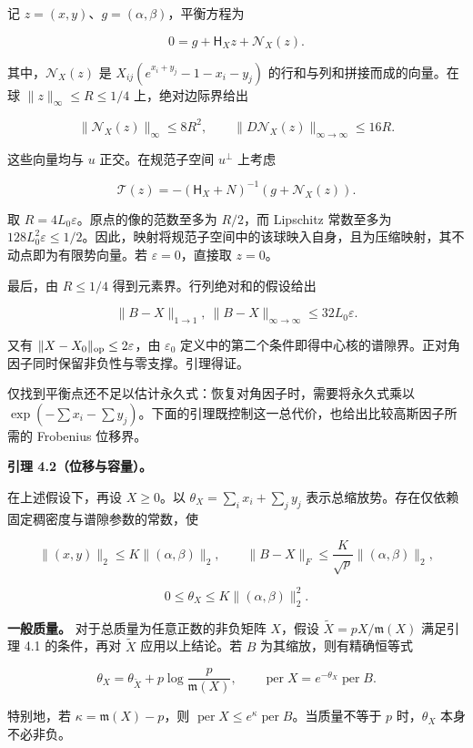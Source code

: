 \documentclass[11pt,a4paper]{article}
\begin{document}
记 \(z=(x,y)\)、\(g=(\alpha,\beta)\)，平衡方程为

\[0=g+\mathsf H_Xz+\mathcal N_X(z).\]

其中，\(\mathcal N_X(z)\) 是 \(X_{ij}(e^{x_i+y_j}-1-x_i-y_j)\) 的行和与列和拼接而成的向量。在球 \(\|z\|_\infty\le R\le1/4\) 上，绝对边际界给出

\[\|\mathcal N_X(z)\|_\infty\le8R^2,\qquad \|D\mathcal N_X(z)\|_{\infty\to\infty}\le16R.\]

这些向量均与 \(u\) 正交。在规范子空间 \(u^\perp\) 上考虑

\[\mathcal T(z)=-(\mathsf H_X+N)^{-1}(g+\mathcal N_X(z)).\]

取 \(R=4L_0\varepsilon\)。原点的像的范数至多为 \(R/2\)，而 Lipschitz 常数至多为 \(128L_0^2\varepsilon\le1/2\)。因此，映射将规范子空间中的该球映入自身，且为压缩映射，其不动点即为有限势向量。若 \(\varepsilon=0\)，直接取 \(z=0\)。

最后，由 \(R\le1/4\) 得到元素界。行列绝对和的假设给出

\[\|B-X\|_{1\to1},\ \|B-X\|_{\infty\to\infty}\le32L_0\varepsilon.\]

又有 \(\|X-X_0\|_{\rm op}\le2\varepsilon\)，由 \(\varepsilon_0\) 定义中的第二个条件即得中心核的谱隙界。正对角因子同时保留非负性与零支撑。引理得证。

仅找到平衡点还不足以估计永久式：恢复对角因子时，需要将永久式乘以 \(\exp(-\sum x_i-\sum y_j)\)。下面的引理既控制这一总代价，也给出比较高斯因子所需的 Frobenius 位移界。

\textbf{引理 4.2（位移与容量）。}

在上述假设下，再设 \(X\ge0\)。以 \(\theta_X=\sum_i x_i+\sum_j y_j\) 表示总缩放势。存在仅依赖固定稠密度与谱隙参数的常数，使

\[\|(x,y)\|_2\le K\|(\alpha,\beta)\|_2,\qquad \|B-X\|_F\le\frac K{\sqrt p}\|(\alpha,\beta)\|_2,\]

\[0\le\theta_X\le K\|(\alpha,\beta)\|_2^2.\]

\textbf{一般质量。} 对于总质量为任意正数的非负矩阵 \(X\)，假设 \(\widetilde X=pX/\mathfrak m(X)\) 满足引理 4.1 的条件，再对 \(\widetilde X\) 应用以上结论。若 \(B\) 为其缩放，则有精确恒等式

\[\theta_X=\theta_{\widetilde X}+p\log\frac p{\mathfrak m(X)},\qquad \operatorname{per}X=e^{-\theta_X}\operatorname{per}B.\]

特别地，若 \(\kappa=\mathfrak m(X)-p\)，则 \(\operatorname{per}X\le e^\kappa\operatorname{per}B\)。当质量不等于 \(p\) 时，\(\theta_X\) 本身不必非负。
\end{document}
